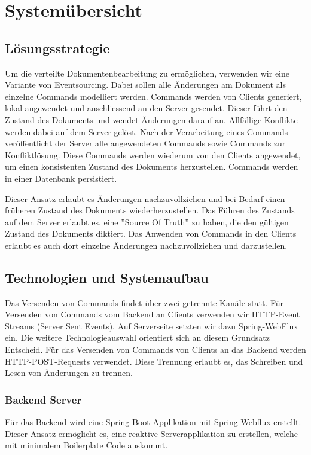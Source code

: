 \section{Systemübersicht}

\subsection{Lösungsstrategie}
Um die verteilte Dokumentenbearbeitung zu ermöglichen, verwenden wir eine Variante von Eventsourcing.
Dabei sollen alle Änderungen am Dokument als einzelne Commands modelliert werden.
Commands werden von Clients generiert, lokal angewendet und anschliessend an den Server gesendet.
Dieser führt den Zustand des Dokuments und wendet Änderungen darauf an.
Allfällige Konflikte werden dabei auf dem Server gelöst.
Nach der Verarbeitung eines Commands veröffentlicht der Server alle angewendeten Commands sowie Commands zur Konfliktlösung.
Diese Commands werden wiederum von den Clients angewendet, um einen konsistenten Zustand des Dokuments herzustellen.
Commands werden in einer Datenbank persistiert.

Dieser Ansatz erlaubt es Änderungen nachzuvollziehen und bei Bedarf einen früheren Zustand des Dokuments wiederherzustellen.
Das Führen des Zustands auf dem Server erlaubt es, eine ''Source Of Truth'' zu haben, die den gültigen Zustand des Dokuments diktiert.
Das Anwenden von Commands in den Clients erlaubt es auch dort einzelne Änderungen nachzuvollziehen und darzustellen.

\subsection{Technologien und Systemaufbau}

Das Versenden von Commands findet über zwei getrennte Kanäle statt.
Für Versenden von Commands vom Backend an Clients verwenden wir HTTP-Event Streams (Server Sent Events).
Auf Serverseite setzten wir dazu Spring-WebFlux ein.
Die weitere Technologieauswahl orientiert sich an diesem Grundsatz Entscheid.
Für das Versenden von Commands von Clients an das Backend werden HTTP-POST-Requests verwendet.
Diese Trennung erlaubt es, das Schreiben und Lesen von Änderungen zu trennen.

\subsubsection{Backend Server}

Für das Backend wird eine Spring Boot Applikation mit Spring Webflux erstellt.
Dieser Ansatz ermöglicht es, eine reaktive Serverapplikation zu erstellen, welche mit minimalem Boilerplate Code auskommt.

